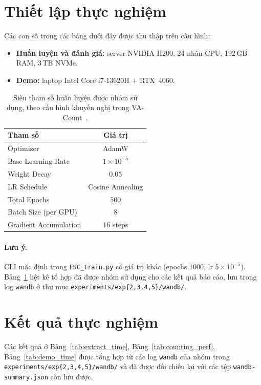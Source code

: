 \documentclass[a4paper,12pt]{report}
\numberwithin{figure}{chapter}
\numberwithin{table}{chapter}
\begin{document}
\section{Thiết lập thực nghiệm}
\label{sec:setup}

Các con số trong các bảng dưới đây được thu thập trên cấu hình:
\begin{itemize}
    \item \textbf{Huấn luyện và đánh giá:} server NVIDIA H200, 24 nhân CPU, 192\,GB RAM, 3\,TB NVMe.
    \item \textbf{Demo:} laptop Intel Core i7-13620H + RTX~4060.
\end{itemize}

\begin{table}[H]
\centering
\renewcommand{\arraystretch}{1.2}
\begin{tabular}{|l|c|}
\hline
\rowcolor[HTML]{EFEFEF}
\textbf{Tham số} & \textbf{Giá trị} \\
\hline
Optimizer & AdamW \\
\hline
Base Learning Rate & $1{\times}10^{-5}$ \\
\hline
Weight Decay & $0.05$ \\
\hline
LR Schedule & Cosine Annealing \\
\hline
Total Epochs & $500$ \\
\hline
Batch Size (per GPU) & $8$ \\
\hline
Gradient Accumulation & $16$ steps \\
\hline
\end{tabular}
\caption{Siêu tham số huấn luyện được nhóm sử dụng, theo cấu hình khuyến nghị trong VA-Count~\cite{vacount}.}
\label{tab:hyperparams}
\end{table}

\paragraph{Lưu ý.}
CLI mặc định trong \texttt{FSC\_train.py} có giá trị khác
(epochs $1000$, lr $5{\times}10^{-5}$).
Bảng~\ref{tab:hyperparams} liệt kê tổ hợp đã được nhóm sử dụng cho các
kết quả báo cáo, lưu trong log \texttt{wandb} ở thư mục
\texttt{experiments/exp\{2,3,4,5\}/wandb/}.

\section{Kết quả thực nghiệm}
\label{sec:results}

Các kết quả ở Bảng~\ref{tab:extract_time}, Bảng~\ref{tab:counting_perf},
Bảng~\ref{tab:demo_time} được tổng hợp từ các log \texttt{wandb} của nhóm
trong \mbox{\texttt{experiments/exp\{2,3,4,5\}/wandb/}}
và đã được đối chiếu lại với các tệp \texttt{wandb-summary.json} còn lưu được.
\end{document}
